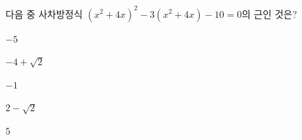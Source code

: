 다음 중 사차방정식 $(x^2+4x)^2-3(x^2+4x)-10=0$의 근인 것은?
\begin{choices32}{\rule[-3ex]{0pt}{8ex}$-5$}{\rule[-3ex]{0pt}{8ex}$-4+\sqrt{2}$}{\rule[-3ex]{0pt}{8ex}$-1$}{\rule[-3ex]{0pt}{8ex}$2-\sqrt{2}$}{\rule[-3ex]{0pt}{8ex}$5$}\end{choices32}
